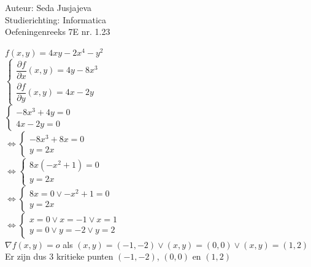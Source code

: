 \documentclass[a4paper]{article}
\begin{document}
\noindent \large Auteur: Seda Jusjajeva\\
\noindent \large Studierichting: Informatica\\
\noindent \large Oefeningenreeks 7E nr. 1.23\\

\medskip

\normalsize

$f(x, y) = 4xy - 2x^4 - y^2$ \\

$\left\{\begin{array}{l}
	\dfrac{\partial f}{\partial x}(x, y) = 4y - 8x^3 \\
	\dfrac{\partial f}{\partial y}(x, y) = 4x - 2y
\end{array}\right.$ \\

$\left\{\begin{array}{l}
    -8x^3 + 4y = 0 \\
    4x - 2y = 0
\end{array}\right.$ \\

$\Leftrightarrow\left\{\begin{array}{l}
    -8x^3 + 8x = 0 \\
    y = 2x
\end{array}\right.$ \\

$\Leftrightarrow\left\{\begin{array}{l}
    8x(-x^2 + 1) = 0 \\
    y = 2x
\end{array}\right.$ \\

$\Leftrightarrow\left\{\begin{array}{l}
    8x = 0 \vee -x^2 + 1 = 0 \\
    y = 2x
\end{array}\right.$ \\

$\Leftrightarrow\left\{\begin{array}{l}
    x = 0 \vee x = -1 \vee x = 1 \\
    y = 0 \vee y = -2 \vee y = 2
\end{array}\right.$ \\

$\nabla f(x, y) = o$ als $ (x, y) = (-1, -2) \vee (x, y) = (0,0) \vee (x, y) = (1, 2)$ \\

Er zijn dus 3 kritieke punten $(-1, -2)$, $(0, 0)$ en $(1, 2)$ \\
\end{document}
